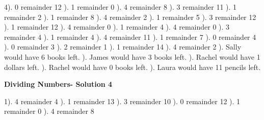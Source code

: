 \documentclass{article}%
\begin{document}
4). 0 remainder 12%
). 1 remainder 0%
). 4 remainder 8%
). 3 remainder 11%
). 1 remainder 2%
). 1 remainder 8%
). 4 remainder 2%
). 1 remainder 5%
). 3 remainder 12%
). 1 remainder 12%
). 4 remainder 0%
). 1 remainder 4%
). 4 remainder 0%
). 3 remainder 4%
). 1 remainder 4%
). 4 remainder 11%
). 1 remainder 7%
). 0 remainder 4%
). 0 remainder 3%
). 2 remainder 1%
). 1 remainder 14%
). 4 remainder 2%
). Sally would have 6 books left.%
). James would have 3 books left.%
). Rachel would have 1 dollars left.%
). Rachel would have 0 books left.%
). Laura would have 11 pencils left.%
\newline%
\newpage%
\large%
\begin{center}%
\textbf{Dividing Numbers- Solution 4}%
\newline%
\end{center} \normalsize%
1). 4 remainder 4%
). 1 remainder 13%
). 3 remainder 10%
). 0 remainder 12%
). 1 remainder 0%
). 4 remainder 8%
\newline%
\end{document}
